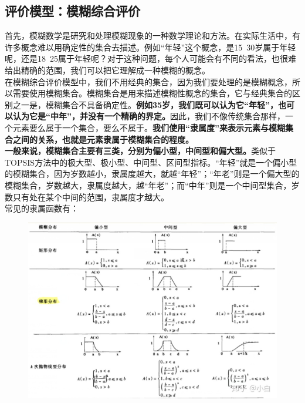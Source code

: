 \documentclass[11pt,a4paper]{article}
\begin{document}
\subsection{评价模型：模糊综合评价}
首先，模糊数学是研究和处理模糊现象的一种数学理论和方法。在实际生活中，有许多概念难以用确定性的集合去描述。例如“年轻”这个概念，是15~30岁属于年轻呢，还是18~25属于年轻呢？对于这种问题，每个人可能会有不同的看法，也很难给出精确的范围，我们可以把它理解成一种模糊的概念。\\
\indent\setlength{\parindent}{2em}在模糊综合评价模型中，我们不用经典的集合，因为我们要处理的是模糊概念，所以需要使用模糊集合。模糊集合是用来描述模糊性概念的集合，它与经典集合的区别之一是，模糊集合不具备确定性。\textbf{例如35岁，我们既可以认为它“年轻”，也可以认为它是“中年”，并没有一个精确的界定。}因此，我们不像传统集合那样，一个元素要么属于一个集合，要么不属于。\textbf{我们使用“隶属度”来表示元素与模糊集合之间的关系，也就是元素隶属于模糊集合的程度。}\\
\indent\setlength{\parindent}{2em}\textbf{一般来说，模糊集合主要有三类，分别为偏小型，中间型和偏大型。}类似于TOPSIS方法中的极大型、极小型、中间型、区间型指标。“年轻”就是一个偏小型的模糊集合，因为岁数越小，隶属度越大，就越“年轻”；“年老”则是一个偏大型的模糊集合，岁数越大，隶属度越大，越“年老”；而“中年”则是一个中间型集合，岁数只有处在某个中间的范围，隶属度才越大。\\
常见的隶属函数有：\\
\begin{figure}[h]
	\centering
	\includegraphics[scale=0.4]{Blurred Math1.jpg}
	\label{fig:label}
\end{figure}
\end{document}
